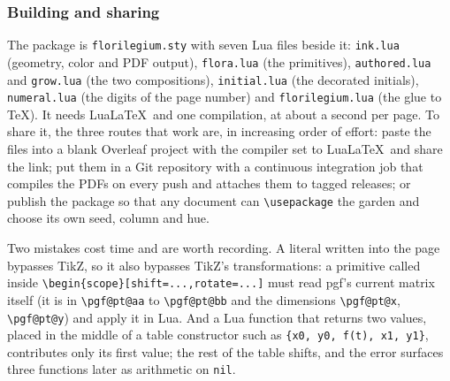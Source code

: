 \subsubsection{Building and sharing}

The package is \texttt{florilegium.sty} with seven Lua files beside it: \texttt{ink.lua}
(geometry, color and PDF output), \texttt{flora.lua} (the primitives),
\texttt{authored.lua} and \texttt{grow.lua} (the two compositions), \texttt{initial.lua}
(the decorated initials), \texttt{numeral.lua} (the digits of the page number) and
\texttt{florilegium.lua} (the glue to \TeX). It needs Lua\LaTeX\ and one compilation, at
about a second per page. To share it, the three routes that work are, in increasing order
of effort: paste the files into a blank Overleaf project with the compiler set to
Lua\LaTeX\ and share the link; put them in a Git repository with a continuous integration
job that compiles the PDFs on every push and attaches them to tagged releases; or publish
the package so that any document can \texttt{\textbackslash usepackage} the garden and
choose its own seed, column and hue.

\begin{remark}
Two mistakes cost time and are worth recording. A literal written into the page bypasses
TikZ, so it also bypasses TikZ's transformations: a primitive called inside
\verb|\begin{scope}[shift=...,rotate=...]| must read pgf's current matrix itself (it is in
\verb|\pgf@pt@aa| to \verb|\pgf@pt@bb| and the dimensions \verb|\pgf@pt@x|,
\verb|\pgf@pt@y|) and apply it in Lua. And a Lua function that returns two values, placed
in the middle of a table constructor such as \verb|{x0, y0, f(t), x1, y1}|, contributes only
its first value; the rest of the table shifts, and the error surfaces three functions
later as arithmetic on \texttt{nil}.
\end{remark}
